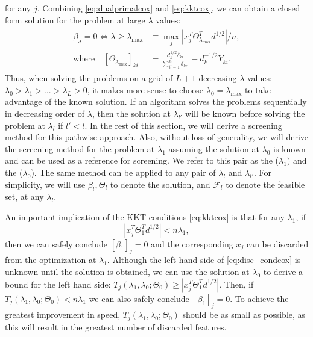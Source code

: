 for any $j$. Combining \eqref{eq:dualprimalcox} and \eqref{eq:kktcox}, we can obtain a closed form solution for the problem at large $\lambda$ values:
\begin{gather}
    \label{eq:lammax}
    \begin{aligned}
        \beta_\lambda=0\iff \lambda \geq \lambda_{\max}&\equiv \max_j \left|x_j^T\Theta^T_{\lambda_{\max}}d^{1/2}\right|/n,\\
        \textrm{where}\quad[\Theta_{\lambda_{\max}}]_{ki}&=\frac{d_k^{1/2}\delta_{ki}}{\sum_{i'=1}^n\delta_{ki'}}-d_k^{-1/2}Y_{ki}.
    \end{aligned}
\end{gather}
Thus, when solving the problems on a grid of $L+1$ decreasing $\lambda$ values: $\lambda_0>\lambda_1>...>\lambda_L>0$, it makes more sense to choose $\lambda_0=\lambda_{\max}$ to take advantage of the known solution. If an algorithm solves the problems sequentially in decreasing order of $\lambda$, then the solution at $\lambda_{l'}$ will be known before solving the problem at $\lambda_l$ if $l'<l$. In the rest of this section, we will derive a screening method for this pathwise approach. Also, without loss of generality, we will derive the screening method for the problem at $\lambda_1$ assuming the solution at $\lambda_0$ is known and can be used as a reference for screening. We refer to this pair as the  ($\lambda_1)$ and the  ($\lambda_0$). The same method can be applied to any pair of $\lambda_{l}$ and $\lambda_{l'}$. For simplicity, we will use $\beta_l,\Theta_l$ to denote the solution, and $\mathcal{F}_l$ to denote the feasible set, at any $\lambda_l$.

An important implication of the KKT conditions \eqref{eq:kktcox} is that for any $\lambda_1$, if 
\begin{equation}
    \label{eq:disc_condcox}
    |x_j^T\Theta_{1}^Td^{1/2}|<n\lambda_1,
\end{equation}
then we can safely conclude $[\beta_1]_{j}=0$ and the corresponding $x_j$ can be discarded from the optimization at $\lambda_1$. Although the left hand side of \eqref{eq:disc_condcox} is unknown until the solution is obtained, we can use the solution at $\lambda_{0}$ to derive a bound for the left hand side: $T_j(\lambda_{1},\lambda_{0};\Theta_{0})\geq |x_j^T\Theta_{1}^Td^{1/2}|$. Then, if $T_j(\lambda_{1},\lambda_{0};\Theta_{0})<n\lambda_1$ we can also safely conclude $[\beta_1]_{j}=0$. To achieve the greatest improvement in speed, $T_j(\lambda_{1},\lambda_{0};\Theta_{0})$ should be as small as possible, as this will result in the greatest number of discarded features.

